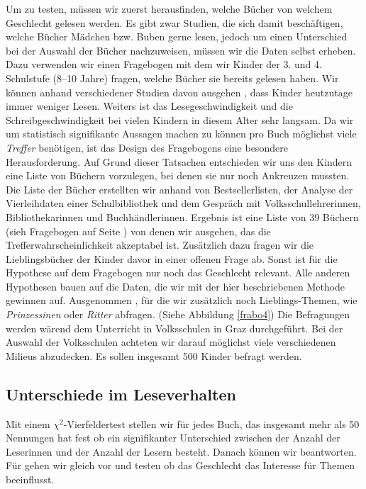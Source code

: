 Um  zu testen, müssen wir zuerst herausfinden, welche
Bücher von welchem Geschlecht gelesen werden. Es gibt zwar Studien, die
sich damit beschäftigen, welche Bücher Mädchen bzw. Buben gerne lesen,
jedoch um einen Unterschied bei der Auswahl der Bücher nachzuweisen,
müssen wir die Daten selbst erheben. Dazu verwenden wir einen Fragebogen
mit dem wir Kinder der 3. und 4. Schulstufe (8--10 Jahre) fragen, welche
Bücher sie bereits gelesen haben. Wir können anhand verschiedener
Studien davon ausgehen , dass Kinder heutzutage immer weniger Lesen.
Weiters ist das Lesegeschwindigkeit und die Schreibgeschwindigkeit bei
vielen Kindern in diesem Alter sehr langsam. Da wir um statistisch
signifikante Aussagen machen zu können pro Buch möglichst viele
\emph{Treffer} benötigen, ist das Design des Fragebogens eine besondere
Herausforderung. Auf Grund dieser Tatsachen entschieden wir uns den
Kindern eine Liste von Büchern vorzulegen, bei denen sie nur noch
Ankreuzen mussten. Die Liste der Bücher erstellten wir anhand von
Bestsellerlisten, der Analyse der Vierleihdaten einer Schulbibliothek
und dem Gespräch mit Volksschullehrerinnen, Bibliothekarinnen und
Buchhändlerinnen. Ergebnis ist eine Liste von 39 Büchern (sieh
Fragebogen auf Seite \pageref{frabo2}) von denen wir ausgehen, das die
Trefferwahrscheinlichkeit akzeptabel ist. Zusätzlich dazu fragen wir die
Lieblingsbücher der Kinder davor in einer offenen Frage ab. Sonst ist
für die Hypothese auf dem Fragebogen nur noch das Geschlecht relevant.
Alle anderen Hypothesen bauen auf die Daten, die wir mit der hier
beschriebenen Methode gewinnen auf. Ausgenommen , für
die wir zusätzlich noch Lieblings-Themen, wie \emph{Prinzessinen} oder
\emph{Ritter} abfragen. (Siehe Abbildung \ref{frabo4}) Die Befragungen
werden wärend dem Unterricht in Volksschulen in Graz durchgeführt. Bei
der Auswahl der Volksschulen achteten wir darauf möglichst viele
verschiedenen Milieus abzudecken. Es sollen insgesamt 500 Kinder befragt
werden.

\subsection{Unterschiede im Leseverhalten}

Mit einem $\chi^2$-Vierfeldertest stellen wir für jedes Buch, das
insgesamt mehr als 50 Nennungen hat fest ob ein signifikanter
Unterschied zwischen der Anzahl der Leserinnen und der Anzahl der Lesern
besteht. Danach können wir  beantworten. Für
 gehen wir gleich vor und testen ob das Geschlecht das
Interesse für Themen beeinflusst.

